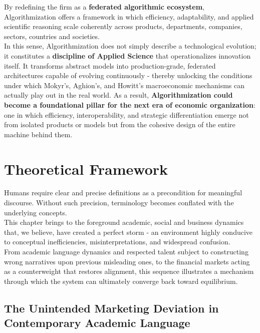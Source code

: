 \documentclass{article}
\begin{document}
By redefining the firm as a \textbf{federated algorithmic ecosystem}, Algorithmization offers a framework in which efficiency, adaptability, and applied scientific reasoning scale coherently across products, departments, companies, sectors, countries and societies.\\

In this sense, Algorithmization does not simply describe a technological evolution; it constitutes a \textbf{discipline of Applied Science} that operationalizes innovation itself. It transforms abstract models into production-grade, federated architectures capable of evolving continuously - thereby unlocking the conditions under which Mokyr’s, Aghion’s, and Howitt’s macroeconomic mechanisms can actually play out in the real world. As a result, \textbf{Algorithmization could become a foundational pillar for the next era of economic organization}: one in which efficiency, interoperability, and strategic differentiation emerge not from isolated products or models but from the cohesive design of the entire machine behind them.\\


\section{Theoretical Framework}
\label{section: Theoretical Framework}
Humans require clear and precise definitions as a precondition for meaningful discourse. Without such precision, terminology becomes conflated with the underlying concepts.\\

This chapter brings to the foreground academic, social and business dynamics that, we believe, have created a perfect storm - an environment highly conducive to conceptual inefficiencies, misinterpretations, and widespread confusion.\\

From academic language dynamics and respected talent subject to constructing wrong narratives upon previous misleading ones, to the financial markets acting as a counterweight that restores alignment, this sequence illustrates a mechanism through which the system can ultimately converge back toward equilibrium.\\


\subsection{The Unintended Marketing Deviation in Contemporary Academic Language}
\label{subsection: The Unintended Marketing Deviation in Contemporary Academic Language}
\end{document}

